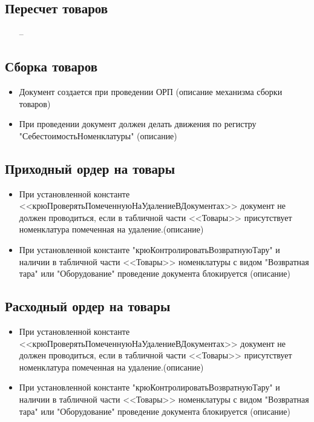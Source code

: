 \subsection{Пересчет товаров}
\begin{itemize}
	\item [--]
\end{itemize}


\subsection{Сборка товаров}
\begin{itemize}
	\item Документ создается при проведении ОРП (описание механизма сборки товаров)
	\item При проведении документ должен делать движения по регистру "СебестоимостьНоменклатуры" (описание)
\end{itemize}



\subsection{Приходный ордер на товары}
\begin{itemize}
	\item При установленной константе <<крюПроверятьПомеченнуюНаУдалениеВДокументах>>
	документ не должен проводиться, если в табличной части <<Товары>> присутствует
	номенклатура помеченная на удаление.(описание)
	\item При установленной константе "крюКонтролироватьВозвратнуюТару" и наличии в табличной части <<Товары>> номенклатуры
	с видом "Возвратная тара" или "Оборудование" проведение документа блокируется (описание)
\end{itemize}


\subsection{Расходный ордер на товары}
\begin{itemize}
	\item При установленной константе <<крюПроверятьПомеченнуюНаУдалениеВДокументах>>
	документ не должен проводиться, если в табличной части <<Товары>> присутствует
	номенклатура помеченная на удаление.(описание)
	\item При установленной константе "крюКонтролироватьВозвратнуюТару" и наличии в табличной части <<Товары>> номенклатуры
	с видом "Возвратная тара" или "Оборудование" проведение документа блокируется (описание)
\end{itemize}


